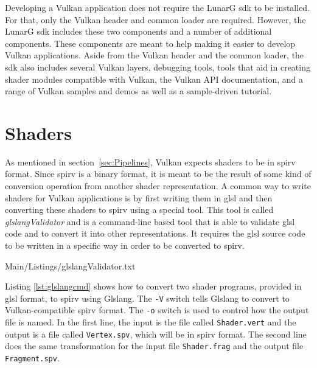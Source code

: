     Developing a Vulkan application does not require the LunarG \gls{sdk} to be installed. For that, only the Vulkan header and common loader are required. However, the LunarG \gls{sdk} includes these two components and a number of additional components. These components are meant to help making it easier to develop Vulkan applications. Aside from the Vulkan header and the common loader, the \gls{sdk} also includes several Vulkan layers, debugging tools, tools that aid in creating shader modules compatible with Vulkan, the Vulkan API documentation, and a range of Vulkan samples and demos as well as a sample-driven tutorial.



  \section{Shaders}
  \label{sec:EnvShaders}
    As mentioned in section~\ref{sec:Pipelines}, Vulkan expects shaders to be in \gls{spirv} format. Since \gls{spirv} is a binary format, it is meant to be the result of some kind of conversion operation from another shader representation.  A common way to write shaders for Vulkan applications is by first writing them in \gls{glsl} and then converting these shaders to \gls{spirv} using a special tool. This tool is called \textit{glslangValidator}\cite{glslangrepo} and is a command-line based tool that is able to validate \gls{glsl} code and to convert it into other representations. It requires the \gls{glsl} source code to be written in a specific way in order to be converted to \gls{spirv}.

    
    {Main/Listings/glslangValidator.txt}


    Listing \ref{lst:glslangcmd} shows how to convert two shader programs, provided in \gls{glsl} format, to \gls{spirv} using Glslang. The \lstinline{-V} switch tells Glslang to convert to Vulkan-compatible \gls{spirv} format. The \lstinline{-o} switch is used to control how the output file is named. In the first line, the input is the file called \lstinline{Shader.vert} and the output is a file called \lstinline{Vertex.spv}, which will be in \gls{spirv} format. The second line does the same transformation for the input file \lstinline{Shader.frag} and the output file \lstinline{Fragment.spv}.

